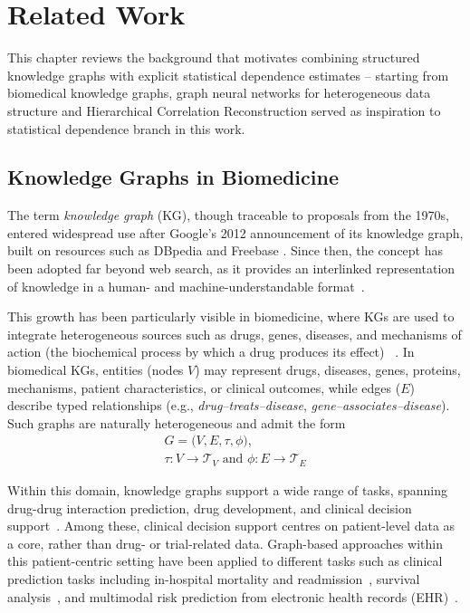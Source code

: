 \chapter{Related Work}
\label{ch:related-work}

This chapter reviews the background that motivates combining structured knowledge graphs with explicit statistical dependence estimates 
-- starting from
biomedical knowledge graphs, graph neural networks for heterogeneous data structure and 
Hierarchical Correlation Reconstruction served as inspiration to statistical dependence branch in this work.

\section{Knowledge Graphs in Biomedicine}
\label{sec:related-kg}

The term \emph{knowledge graph} (KG), though traceable to proposals from the
1970s, entered widespread use after Google's 2012 announcement of its
knowledge graph, built on resources such as DBpedia and Freebase
\cite{hogan2021knowledge}. Since then, the concept has been adopted far
beyond web search, as it provides an interlinked representation of
knowledge in a human- and machine-understandable
format~\cite{barrasa2023building}.

This growth has been particularly visible in biomedicine, where
KGs are used to integrate heterogeneous sources such as
drugs, genes, diseases, and mechanisms of action (the biochemical process by which a drug produces its effect) 
~\cite{maclean2021knowledge}.
In biomedical KGs, entities (nodes $V$) may represent drugs, diseases, genes,
proteins, mechanisms, patient characteristics, or clinical outcomes, while
edges ($E$) describe typed relationships (e.g.,
\emph{drug--treats--disease}, \emph{gene--associates--disease}).
Such graphs are naturally heterogeneous and admit the form~\cite{hu2020hgt}
\begin{equation}
\label{eq:hetero-graph}
\begin{gathered}
G = \bigl(V, E, \tau, \phi\bigr), \\[0.3em]
{\scriptstyle
\tau \colon V \longrightarrow \mathcal{T}_V \text{ and }
\phi \colon E \longrightarrow \mathcal{T}_E
}
\end{gathered}
\end{equation}

Within this domain, knowledge graphs support a wide range of tasks,
spanning drug-drug interaction prediction, drug development, 
and clinical decision support~\cite{cui2025hkgreview}.
Among these, clinical decision support centres on
patient-level data as a core, rather than drug- or trial-related data.
Graph-based approaches within this patient-centric
setting have been applied to different tasks such as clinical prediction tasks including
in-hospital mortality and readmission~\cite{jiang2024graphcare}, survival
analysis~\cite{tan2023gnnsurv}, and multimodal risk prediction from
electronic health records (EHR)~\cite{zitnik2024graphai}.

